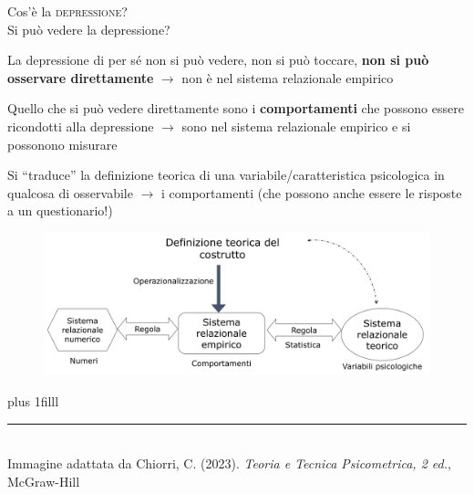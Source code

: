 \documentclass[compress]{beamer}
\begin{document}
\begin{frame}
	\begin{center}
		Cos'è la {\Large{\scshape{depressione}}}?
		\pause
		\\\vspace{1.5mm} Si può vedere la depressione?
	\end{center}
	
	\pause
	La depressione di per sé non si può vedere, non si può toccare, \textbf{non si può osservare direttamente} $\rightarrow$ non è nel sistema relazionale empirico
	
	\vspace{1.5mm}
	
	Quello che si può vedere direttamente sono i \textbf{comportamenti} che possono essere ricondotti alla depressione $\rightarrow$ sono nel sistema relazionale empirico e si possonono misurare 
	
	Si ``traduce'' la definizione teorica di una variabile/caratteristica psicologica in qualcosa di osservabile $\rightarrow$ i comportamenti (che possono anche essere le risposte a un questionario!)
\end{frame}

\begin{frame}
	
	\vspace*{5mm}
	\begin{figure}
		\centering
		\includegraphics[width=.9\linewidth]{misura.png}
	\end{figure}
	
\vskip0pt plus 1filll

\color{template}\rule{0.30\linewidth}{0.5pt}\\
\color{black}
\scriptsize{Immagine adattata da Chiorri, C. (2023). \emph{Teoria e Tecnica Psicometrica, 2 ed.}, McGraw-Hill}

\end{frame}
\end{document}
